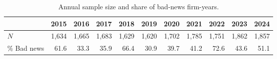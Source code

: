 \begin{table}[H]
\centering
\caption{Annual sample size and share of bad-news firm-years.}
\label{tab:yearly_n}
\small
\begin{tabular}{lrrrrrrrrrr}
\toprule
 & 2015 & 2016 & 2017 & 2018 & 2019 & 2020 & 2021 & 2022 & 2023 & 2024 \\
\midrule
$N$ & 1,634 & 1,665 & 1,683 & 1,629 & 1,620 & 1,702 & 1,785 & 1,751 & 1,862 & 1,857 \\
\% Bad news & 61.6 & 33.3 & 35.9 & 66.4 & 30.9 & 39.7 & 41.2 & 72.6 & 43.6 & 51.1 \\
\bottomrule
\end{tabular}
\end{table}
